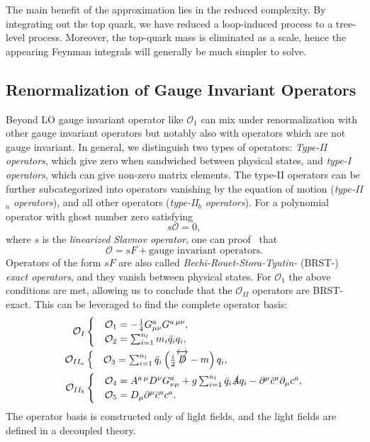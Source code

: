The main benefit of the approximation lies in the reduced complexity. By integrating out the top quark, we have reduced a loop-induced process to a tree-level process. Moreover, the top-quark mass is eliminated as a scale, hence the appearing Feynman integrals will generally be much simpler to solve.

\subsection{Renormalization of Gauge Invariant Operators}
Beyond \acs{LO} gauge invariant operator like $\mathcal{O}_1$ can mix under renormalization with other gauge invariant operators but notably also with operators which are not gauge invariant. In general, we distinguish two types of operators: \textit{Type-II operators}, which give zero when sandwiched between physical states, and \textit{type-I operators}, which can give non-zero matrix elements. The type-II operators can be further subcategorized into operators vanishing by the equation of motion (\textit{type-II${}_a$ operators}), and all other operators (\textit{type-II${}_b$ operators}). For a polynomial operator with ghost number zero satisfying
\begin{equation}
s \mathcal{O} = 0,
\end{equation}
where $s$ is the \textit{linearized Slavnov operator}, one can proof~\cite{Kluberg-Stern:1974iel, Joglekar:1975nu, Henneaux:2011rma} that
\begin{equation}
\mathcal{O} = s F + \text{gauge invariant operators}.
\end{equation}
Operators of the form $s F$ are also called \textit{Bechi-Rouet-Stora-Tyutin-} (BRST-) \textit{exact operators}, and they vanish between physical states. For $\mathcal{O}_1$ the above conditions are met, allowing us to conclude that the $\mathcal{O}_{II}$ operators are BRST-exact. This can be leveraged to find the complete operator basis:
\begin{equation}
\begin{split}
\mathcal{O}_{I} &\begin{cases} &\mathcal{O}_1 = -\frac{1}{4} G^a_{\mu \nu} G^{a\, \mu\nu}, \\
&\mathcal{O}_2 = \sum_{i=1}^{n_l} m_i \bar{q}_i q_i, \end{cases} \\
\mathcal{O}_{II_a} &\begin{cases} &\mathcal{O}_3 = \sum_{i=1}^{n_l} \bar{q}_i \left( \frac{i}{2} \overleftrightarrow{\slashed{D}} - m \right) q_i, \end{cases} \\
\mathcal{O}_{II_b} &\begin{cases} &\mathcal{O}_4 = A^{a\, \mu} D^\nu G_{\nu\mu}^a + g \sum_{i=1}^{n_l} \bar{q}_i \slashed{A} q_i - \partial^\mu \bar{c}^a \partial_\mu c^a, \\
&\mathcal{O}_5 = D_\mu \partial^\mu \bar{c}^a c^a. \end{cases}
\end{split}
\label{eq:4:operators}
\end{equation}
The operator basis is constructed only of light fields, and the light fields are defined in a decoupled theory.

